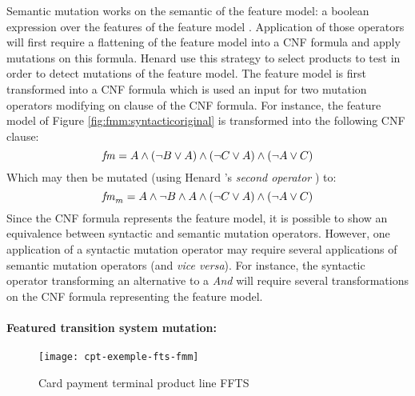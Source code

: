 Semantic mutation works on the semantic of the feature model: a boolean expression over the features of the feature model \cite{Schobbens2007}. Application of those operators will first require a flattening of the feature model into a \gls{CNF} formula \cite{Henard2015b} and apply mutations on this formula. Henard \etal \cite{Henard2013b,Henard2014} use this strategy to select products to test in order to detect mutations of the feature model. The feature model is first transformed into a \gls{CNF} formula which is used an input for two mutation operators modifying on clause of the CNF formula. For instance, the feature model of Figure \ref{fig:fmm:syntacticoriginal} is transformed into the following CNF clause:
$$\mathit{fm} = A \wedge (\neg B \vee A) \wedge (\neg C \vee A) \wedge (\neg A \vee C)$$
Which may then be mutated (using Henard \etal's \textit{second operator} \cite{Henard2013b}) to:
$$\mathit{fm}_m = A \wedge \neg B \wedge A \wedge (\neg C \vee A) \wedge (\neg A \vee C)$$
%
Since the CNF formula represents the feature model, it is possible to show an equivalence between syntactic and semantic mutation operators. However, one application of a syntactic mutation operator may require several applications of semantic mutation operators (and \textit{vice versa}). For instance, the syntactic operator transforming an alternative to a \textit{And} will require several transformations on the CNF formula representing the feature model. 

\paragraph{Featured transition system mutation:}

\begin{figure}
	\centering
	\texttt{[image: cpt-exemple-fts-fmm]}
	\caption{Card payment terminal product line FFTS}
	\label{fig:fmm:ftsfmmexemple}
\end{figure}

